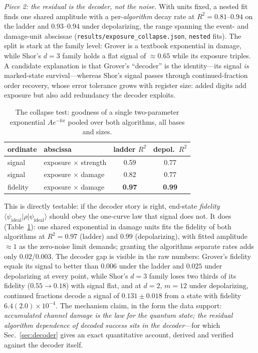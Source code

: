 \documentclass[aps,pra,reprint,superscriptaddress,nofootinbib,floatfix]{revtex4-2}
\begin{document}
\emph{Piece 2: the residual is the decoder, not the noise.} With units
fixed, a nested fit finds one shared amplitude with a per-\emph{algorithm}
decay rate at $R^2=0.81$--$0.94$ on the ladder and $0.93$--$0.94$ under
depolarizing, the range spanning the event- and damage-unit abscissae
(\texttt{results/exposure\_collapse.json}, \texttt{nested} fits). The
split is stark
at the family level: Grover is a textbook exponential in damage, while
Shor's $d=3$ family holds a flat signal of ${\approx}0.65$ while its
exposure triples. A candidate explanation is that Grover's ``decoder'' is the
identity---its signal \emph{is} marked-state survival---whereas Shor's
signal passes through continued-fraction order recovery, whose error
tolerance grows with register size: added digits add exposure but also
add redundancy the decoder exploits.

\begin{table}[t]
\caption{The collapse test: goodness of a single two-parameter
exponential $A e^{-kx}$ pooled over both algorithms, all bases and
sizes.}
\label{tab:collapse}
\begin{ruledtabular}
\begin{tabular}{llcc}
ordinate & abscissa & ladder $R^2$ & depol.\ $R^2$ \\
\hline
signal   & exposure $\times$ strength & 0.59 & 0.77 \\
signal   & exposure $\times$ damage   & 0.82 & 0.77 \\
fidelity & exposure $\times$ damage   & \textbf{0.97} & \textbf{0.99} \\
\end{tabular}
\end{ruledtabular}
\end{table}

This is directly testable: if the decoder story is right, end-state
\emph{fidelity} $\langle\psi_{\mathrm{ideal}}\rvert\rho\lvert
\psi_{\mathrm{ideal}}\rangle$ should obey the one-curve law that signal
does not. It does (Table~\ref{tab:collapse}): one shared exponential in
damage units fits the fidelity of both algorithms at $R^2=0.97$ (ladder)
and $0.99$ (depolarizing), with fitted amplitude ${\approx}1$ as the
zero-noise limit demands; granting the algorithms separate rates adds
only $0.02$/$0.003$. The decoder gap is visible in the raw numbers:
Grover's fidelity equals its signal to better than $0.006$ under the
ladder and $0.025$ under depolarizing at every point, while Shor's
$d=3$ family loses two thirds of its fidelity ($0.55\to0.18$) with
signal flat, and at $d=2$, $m=12$ under depolarizing, continued
fractions decode a signal of $0.131\pm0.018$ from a state with
fidelity $6.4(2.0)\times10^{-4}$. The mechanism claim, in the form the data
support: \emph{accumulated channel damage is the law for the quantum
state; the residual algorithm dependence of decoded success sits in
the decoder}---for which Sec.~\ref{sec:decoder} gives an exact
quantitative account, derived and verified against the decoder
itself.
\end{document}
